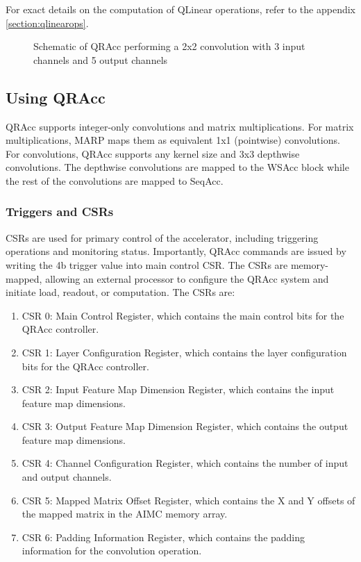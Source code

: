 For exact details on the computation of QLinear operations, refer to the appendix \ref{section:qlinearops}.

\begin{figure}[h]
    \centering
    
    \caption{Schematic of QRAcc performing a 2x2 convolution with 3 input channels and 5 output channels}
    \label{fig:imc_qrAccConvSchem}
\end{figure}

\subsection{Using QRAcc}

QRAcc supports integer-only convolutions and matrix multiplications. For matrix multiplications, MARP maps them as equivalent 1x1 (pointwise) convolutions. For convolutions, QRAcc supports any kernel size and 3x3 depthwise convolutions. The depthwise convolutions are mapped to the WSAcc block while the rest of the convolutions are mapped to SeqAcc.

\subsubsection{Triggers and CSRs}

CSRs are used for primary control of the accelerator, including triggering operations and monitoring status. Importantly, QRAcc commands are issued by writing the 4b trigger value into main control CSR. The CSRs are memory-mapped, allowing an external processor to configure the QRAcc system and initiate load, readout, or computation. The CSRs are:

\begin{enumerate}
  \item CSR 0: Main Control Register, which contains the main control bits for the QRAcc controller.
  \item CSR 1: Layer Configuration Register, which contains the layer configuration bits for the QRAcc controller.
  \item CSR 2: Input Feature Map Dimension Register, which contains the input feature map dimensions.
  \item CSR 3: Output Feature Map Dimension Register, which contains the output feature map dimensions.
  \item CSR 4: Channel Configuration Register, which contains the number of input and output channels.
  \item CSR 5: Mapped Matrix Offset Register, which contains the X and Y offsets of the mapped matrix in the AIMC memory array.
  \item CSR 6: Padding Information Register, which contains the padding information for the convolution operation.
\end{enumerate}

